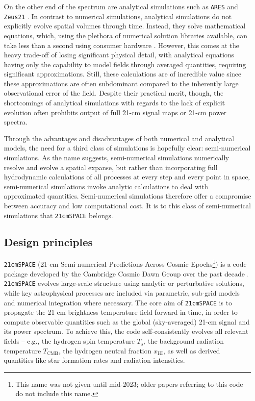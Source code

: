 \documentclass[floats,floatfix,showpacs,amssymb,prd,superscriptaddress,nofootinbib, 11pt]{revtex4-2} %
\newcommand{\code}{\texttt}
\begin{document}
On the other end of the spectrum are analytical simulations such as \code{ARES} \citep{Mirocha_2014} and \code{Zeus21} \citep{Munoz_2023}. In contrast to numerical simulations, analytical simulations do not explicitly evolve spatial volumes through time. Instead, they solve mathematical equations, which, using the plethora of numerical solution libraries available, can take less than a second using consumer hardware \citep{gessey-jones_thesis}. However, this comes at the heavy trade-off of losing significant physical detail, with analytical equations having only the capability to model fields through averaged quantities, requiring significant approximations. Still, these calculations are of incredible value since these approximations are often subdominant compared to the inherently large observational error of the field. Despite their practical merit, though, the shortcomings of analytical simulations with regards to the lack of explicit evolution often prohibits output of full 21-cm signal maps or 21-cm power spectra.

Through the advantages and disadvantages of both numerical and analytical models, the need for a third class of simulations is hopefully clear: semi-numerical simulations. As the name suggests, semi-numerical simulations numerically resolve and evolve a spatial expanse, but rather than incorporating full hydrodynamic calculations of all processes at every step and every point in space, semi-numerical simulations invoke analytic calculations to deal with approximated quantities. Semi-numerical simulations therefore offer a compromise between accuracy and low computational cost. It is to this class of semi-numerical simulations that \code{21cmSPACE} belongs.


\subsection{Design principles}
\code{21cmSPACE} (21-cm Semi-numerical Predictions Across Cosmic Epochs\footnote{This name was not given until mid-2023; older papers referring to this code do not include this name.}) is a code package developed by the Cambridge Cosmic Dawn Group over the past decade \citep{Fialkov_2012, Visbal_2012}. \code{21cmSPACE} evolves large-scale structure using analytic or perturbative solutions, while key astrophysical processes are included via parametric, sub-grid models and numerical integration where necessary. The core aim of \code{21cmSPACE} is to propagate the 21-cm brightness temperature field forward in time, in order to compute observable quantities such as the global (sky-averaged) 21-cm signal and its power spectrum. To achieve this, the code self-consistently evolves all relevant fields -- e.g., the hydrogen spin temperature $T_s$, the background radiation temperature $T_{\text{CMB}}$, the hydrogen neutral fraction $x_{\text{HI}}$, as well as derived quantities like star formation rates and radiation intensities.
\end{document}
